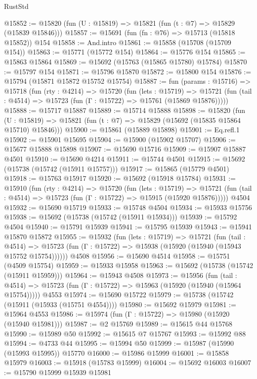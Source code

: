 \begin{lexlean}{RustStd}
\begin{coremodule}
@15852 := @15820 (fun (U : @15819) => @15821 (fun (t : @7) => @15829 (@15839 @15846)))
@15857 := @15691 (fun (fn : @76) => @15713 (@15818 @15852)) @154
@15858 := And.intro
@15861 := @15858 (@15708 (@15709 @154))
@15863 := @15771 (@15772 @154)
@15864 := @15776 @154
@15865 := @15863 @15864
@15869 := @15692 (@15763 (@15865 @15780) @15784)
@15870 := @15797 @154
@15871 := @15796 @15870
@15872 := @15800 @154
@15876 := @15794 (@15871 @15872 @15752 @15754)
@15887 := fun (params : @15716) =>
  @15718
    (fun (rty : @4214) =>
    @15720
      (fun (lets : @15719) =>
      @15721 (fun (tail : @4514) => @15723 (fun (Γ : @15722) => @15761 (@15869 @15876)))))
@15888 := @15717 @15887
@15889 := @15714 @15888
@15898 := @15820
    (fun (U : @15819) => @15821 (fun (t : @7) => @15829 (@15692 (@15835 @15864 @15710) @15846)))
@15900 := @15861 (@15889 @15898)
@15901 := Eq.refl.{1}
@15902 := @15901 @15695
@15904 := @15900 (@15902 @15707)
@15906 := @15677 @15888 @15898
@15907 := @15690 @15716
@15909 := @15907 @15887 @4501
@15910 := @15690 @4214
@15911 := @15744 @4501
@15915 := @15692 (@15738 (@15742 (@15911 @15757)))
@15917 := @15865 (@15779 @4501)
@15918 := @15763 @15917
@15920 := @15692 (@15918 @15784)
@15931 := @15910
    (fun (rty : @4214) =>
    @15720
      (fun (lets : @15719) =>
      @15721 (fun (tail : @4514) => @15723 (fun (Γ : @15722) => @15915 (@15920 @15876)))))
    @4504
@15932 := @15690 @15719
@15933 := @15748 @4504
@15934 := @15933 @15756
@15938 := @15692 (@15738 (@15742 (@15911 @15934)))
@15939 := @15792 @4504
@15940 := @15791 @15939
@15941 := @15795 @15939
@15943 := @15941 @15870 @15872
@15955 := @15932
    (fun (lets : @15719) =>
    @15721
      (fun (tail : @4514) =>
      @15723 (fun (Γ : @15722) => @15938 (@15920 (@15940 (@15943 @15752 @15754))))))
    @4508
@15956 := @15690 @4514
@15958 := @15751 (@4509 @15754)
@15959 := @15933 @15958
@15963 := @15692 (@15738 (@15742 (@15911 @15959)))
@15964 := @15943 @4508
@15973 := @15956
    (fun (tail : @4514) => @15723 (fun (Γ : @15722) => @15963 (@15920 (@15940 (@15964 @15754)))))
    @4553
@15974 := @15690 @15722
@15979 := @15738 (@15742 (@15911 (@15933 (@15751 @4554))))
@15980 := @15692 @15979
@15981 := @15964 @4553
@15986 := @15974 (fun (Γ : @15722) => @15980 (@15920 (@15940 @15981)))
@15987 := @2 @15769
@15989 := @15615 @44 @15768
@15990 := @15989 @50
@15992 := @15615 @7 @15767
@15993 := @15992 @88
@15994 := @4733 @44
@15995 := @15994 @50
@15999 := @15987 (@15990 (@15993 @15995)) @15770
@16000 := @15986 @15999
@16001 := @15858 @15979
@16003 := @15918 (@15783 @15999)
@16004 := @15692 @16003
@16007 := @15790 @15999 @15939 @15981

\end{coremodule}
\end{lexlean}
